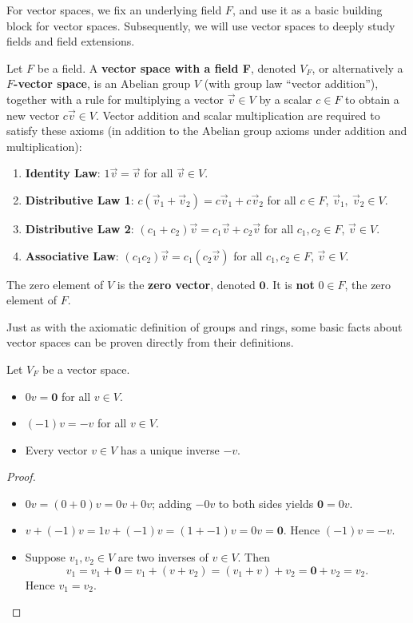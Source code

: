 \documentclass[math1530-lecture-notes]{subfiles}
\begin{document}
For vector spaces, we fix an underlying field $F$, and use it as a basic building block for vector
spaces. Subsequently, we will use vector spaces to deeply study fields and field extensions.

\begin{definition}{}
  Let $F$ be a field. A \textbf{vector space with a field F}, denoted $V_F$, or alternatively a
  \textbf{$F$-vector space}, is an Abelian group $V$ (with group law ``vector addition''), together
  with a rule for multiplying a vector $\vec{v}\in V$ by a scalar $c\in F$ to obtain a new vector
  $c\vec{v}\in V$. Vector addition and scalar multiplication are required to satisfy these axioms
  (in addition to the Abelian group axioms under addition and multiplication):
  \begin{enumerate}
    \item \textbf{Identity Law}: $1\vec{v}=\vec{v}$ for all $\vec{v}\in V$.
    \item \textbf{Distributive Law 1}: $c(\vec{v}_1+\vec{v}_2)=c\vec{v}_1+c\vec{v}_2$ for all $c\in
      F$, $\vec{v}_1,\ \vec{v}_2\in V$.
    \item \textbf{Distributive Law 2}: $(c_1+c_2)\vec{v}=c_1\vec{v}+c_2\vec{v}$ for all $c_1,c_2\in
      F$, $\vec{v}\in V$.
    \item \textbf{Associative Law}: $(c_1c_2)\vec{v}=c_1(c_2\vec{v})$ for all $c_1,c_2\in F$,
      $\vec{v}\in V$.
  \end{enumerate}
  The zero element of $V$ is the \textbf{zero vector}, denoted $\textbf{0}$. It is \textbf{not}
  $0\in F$, the zero element of $F$.
\end{definition}

Just as with the axiomatic definition of groups and rings, some basic facts about vector spaces can
be proven directly from their definitions.
\begin{proposition}[]{}
  Let $V_F$ be a vector space.
  \begin{itemize}
    \item $0v=\textbf{0}$ for all $v\in V$.
    \item $(-1)v=-v$ for all $v\in V$.
    \item Every vector $v\in V$ has a unique inverse $-v$.
  \end{itemize}
\end{proposition}
\begin{proof}[Proof]
  \begin{itemize}
    \item $0v=(0+0)v=0v+0v$; adding $-0v$ to both sides yields $\textbf{0}=0v$.
    \item $v+(-1)v=1v+(-1)v=(1+-1)v=0v=\textbf{0}$. Hence $(-1)v=-v$.
    \item Suppose $v_1,v_2\in V$ are two inverses of $v\in V$. Then \[
        v_1=v_1+\textbf{0}=v_1+(v+v_2)=(v_1+v)+v_2=\textbf{0}+v_2=v_2
    .\] Hence $v_1=v_2$.
  \end{itemize}
\end{proof}
\end{document}
